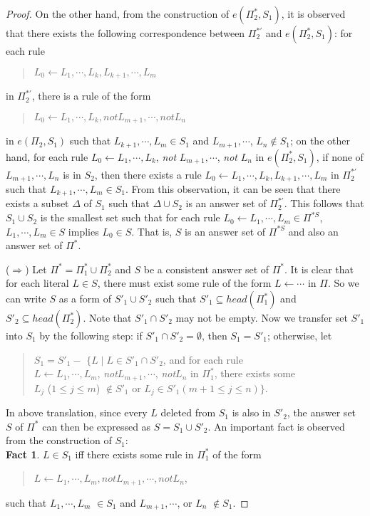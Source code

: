 \documentclass{tlp}
\begin{document}
\begin{proof}
On the other hand, from the construction of $e(\Pi_{2}^{*},S_{1})$,
it is observed that there exists the following correspondence
between $\Pi_{2}^{*'}$ and $e(\Pi_{2}^{*},S_{1})$:
for each rule
\begin{quote}
$L_{0}\leftarrow L_{1},\cdots, L_{k},L_{k+1},\cdots, L_{m}$
\end{quote}
in $\Pi_{2}^{*'}$, there is a rule of the form
\begin{quote}
$L_{0}\leftarrow L_{1},\cdots, L_{k},not L_{m+1},\cdots, not L_{n}$ 
\end{quote}
in $e(\Pi_{2},S_{1})$ such that
$L_{k+1},\cdots, L_{m}\in S_{1}$ and
$L_{m+1},\cdots$, $L_{n}\not\in S_{1}$; on the other hand,
for each rule
$L_{0}\leftarrow L_{1},\cdots, L_{k}$, {\em not} $L_{m+1},\cdots$,
{\em not} $L_{n}$ in $e(\Pi_{2}^{*},S_{1})$,
if none of $L_{m+1},\cdots, L_{n}$ is in $S_2$, then
there exists a rule $L_{0}\leftarrow L_{1},\cdots, L_{k},L_{k+1},\cdots, L_{m}$ in
$\Pi_{2}^{*'}$ such that $L_{k+1},\cdots, L_{m}\in S_{1}$.
From this observation, it can be seen that there
exists a subset $\Delta$ of $S_{1}$ such that
$\Delta\cup S_2$ is an answer set of $\Pi_{2}^{*'}$.
This follows that $S_{1}\cup S_2$ is the smallest set
such that for each rule $L_{0}\leftarrow L_{1},\cdots, L_{m}\in \Pi^{* S}$,
$L_{1},\cdots,L_{m}\in S$ implies $L_{0}\in S$.
That is, $S$ is an answer set of $\Pi^{* S}$ and also
an answer set of $\Pi^{*}$.

($\Rightarrow$) Let $\Pi^{*}=\Pi_{1}^{*}\cup \Pi_{2}^{*}$ and
$S$ be a consistent answer set of $\Pi^{*}$.
It is clear that for each literal $L\in S$, there
must exist some rule of the form $L\leftarrow \cdots$ in $\Pi$.
So we can write $S$ as a form of $S'_{1}\cup S'_{2}$
such that $S'_{1}\subseteq head(\Pi_{1}^{*})$ and
$S'_{2}\subseteq head(\Pi_{2}^{*})$. Note that
$S'_{1}\cap S'_{2}$ may not be empty.
Now we transfer set $S'_{1}$ into $S_{1}$ by the following step:
if $S'_{1}\cap S'_{2}=\emptyset$, then
$S_{1}=S'_{1}$; otherwise, let
% 
% 
\begin{quote}
$S_{1} =S'_{1} -$
$\{L\mid L\in S'_{1}\cap S'_{2}$, and for each rule\\
\hspace*{.9in}
$L\leftarrow L_{1},\cdots,L_{m}$, {\em not}$L_{m+1},\cdots$, {\em not}$L_{n}$ in
$\Pi_{1}^{*}$, there exists some\\
\hspace*{.9in}
$L_{j}$ ($1\leq j\leq m$) $\not\in S'_{1}$ or
$L_{j}\in S'_{1} (m+1\leq j\leq n)\}$.
% 
\end{quote}
In above translation,
since every $L$ deleted from $S_{1}$ is also in $S'_{2}$,
the answer set $S$ of $\Pi^{*}$ can then be expressed as
% 
$S=S_{1}\cup S'_{2}$.
An important fact is observed from the construction of
$S_{1}$:\\
{\bf Fact 1}. $L\in S_{1}$ iff there exists some rule
in $\Pi_{1}^{*}$ of the form
\begin{quote}
$L\leftarrow L_{1},\cdots,L_{m},not L_{m+1},\cdots, not L_{n}$, 
\end{quote}
such that $L_{1},\cdots,L_{m}$
$\in S_{1}$ and $L_{m+1},\cdots$, or $L_{n}$
$\not\in S_{1}$.


\end{proof}
\end{document}

